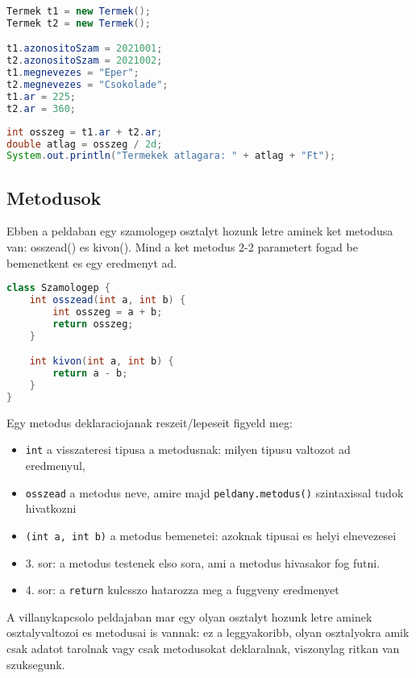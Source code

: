 \documentclass{article}
\let\l\lstinline
\begin{document}
\begin{lstlisting}[language=Java, caption=Termekek valtozoinak beallitasa]
Termek t1 = new Termek();
Termek t2 = new Termek();

t1.azonositoSzam = 2021001;
t2.azonositoSzam = 2021002;
t1.megnevezes = "Eper";
t2.megnevezes = "Csokolade";
t1.ar = 225;
t2.ar = 360;
\end{lstlisting}

\begin{lstlisting}[language=Java, caption=Termekek atlagaranak kiszamolasa]
int osszeg = t1.ar + t2.ar;
double atlag = osszeg / 2d;
System.out.println("Termekek atlagara: " + atlag + "Ft");
\end{lstlisting}

\newpage

\subsection{Metodusok}

Ebben a peldaban egy szamologep osztalyt hozunk letre aminek ket metodusa van: osszead() es kivon(). Mind a ket
metodus 2-2 parametert fogad be bemenetkent es egy eredmenyt ad.

\begin{lstlisting}[language=Java, caption=Szamologep osztaly metodusokkal]
class Szamologep {
    int osszead(int a, int b) {
        int osszeg = a + b;
        return osszeg;
    }

    int kivon(int a, int b) {
        return a - b;
    }
}
\end{lstlisting}

Egy metodus deklaraciojanak reszeit/lepeseit figyeld meg:
\begin{itemize}
    \item \l{int} a visszateresi tipusa a metodusnak: milyen tipusu valtozot ad eredmenyul,
    \item \l{osszead} a metodus neve, amire majd \l{peldany.metodus()} szintaxissal tudok hivatkozni
    \item \l{(int a, int b)} a metodus bemenetei: azoknak tipusai es helyi elnevezesei
    \item 3. sor: a metodus testenek elso sora, ami a metodus hivasakor fog futni.
    \item 4. sor: a \l{return} kulcsszo hatarozza meg a fuggveny eredmenyet
\end{itemize}

A villanykapcsolo peldajaban mar egy olyan osztalyt hozunk letre aminek osztalyvaltozoi es metodusai is vannak: ez a
leggyakoribb, olyan osztalyokra amik csak adatot tarolnak vagy csak metodusokat deklaralnak, viszonylag ritkan van
szuksegunk.
\end{document}
